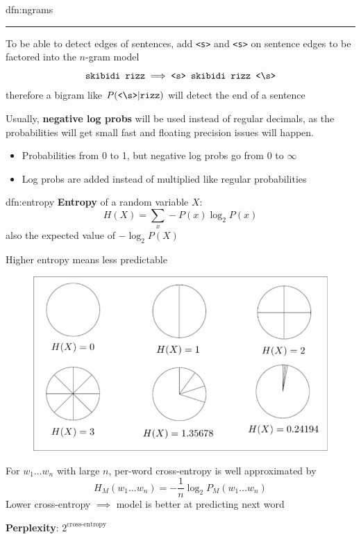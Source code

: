 \documentclass[landscape, 8pt]{extarticle}
\begin{document}
\begin{multicols}{3}
\begin{dfn}{dfn:ngrams}{}
    \noindent\rule{\textwidth}{0.2pt}
    To be able to detect edges of sentences, add \texttt{<s>} and \texttt{<s>} on sentence edges to be factored into the $n$-gram model
    \[\text{\texttt{skibidi rizz}} \implies \text{\texttt{<s> skibidi rizz <\symbol{92}s>}}\]
    therefore a bigram like $P(\text{\texttt{<\symbol{92}s>}} | \tt{rizz})$ will detect the end of a sentence 

    Usually, \textbf{negative log probs} will be used instead of regular decimals, as the probabilities will get small fast and floating precision issues will happen.
    \begin{itemize}[leftmargin=*]
        \setlength\itemsep{0em}
        \item Probabilities from 0 to 1, but negative log probs go from 0 to $\infty$
        \item Log probs are added instead of multiplied like regular probabilities
    \end{itemize}
\end{dfn}

\begin{dfn}[Entropy]{dfn:entropy}{}
    \textbf{Entropy} of a random variable $X$:
    \[H(X) = \sum_{x} - P(x) \log_{2}P(x)\]
    also the expected value of $-\log_{2}P(X)$

    Higher entropy means less predictable

    \begin{figure}[H]
        \centering
        \includegraphics[width=0.6\linewidth]{images/2024-05-09-111807_hyprshot.png}
    \end{figure}

    For $w_{1}\dots w_{n}$ with large $n$, per-word cross-entropy is well approximated by
    \[H_{M}(w_{1}\dots w_{n}) = -\frac{1}{n} \log_{2}P_{M}(w_{1}\dots w_{n})\]
    Lower cross-entropy $\implies$ model is better at predicting next word

    \textbf{Perplexity}: $2^{\text{cross-entropy}}$
\end{dfn}



\end{multicols}
\end{document}
